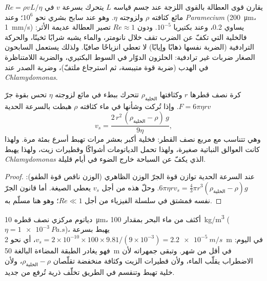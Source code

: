\begin{proposition}\label{prop:b2:unicellular-diversity:reynolds}
\emph{} $Re = \rho v L/\eta$ يقارن قوى العطالة بالقوى
اللزجة عند جسم قياسه $L$ يتحرك بسرعة $v$ في مائع كثافته $\rho$
ولزوجته $\eta$. وهو عند سابح بشري نحو $10^6$؛ وعند
\emph{Paramecium} (\qty{200}{\micro m}، \qty{1}{mm/s}) يساوي 0.2،
وعند بكتيريا $10^{-5}$. ودون $Re \approx 1$ تصير العطالة عديمة
الأثر: فالخلية التي تكفّ عن الضرب تقف خلال نانومتر، والماء يشبه
شرابًا ثخينًا، والحركة الترادفية (الضربة نفسها ذهابًا وإيابًا) لا
تعطي انزياحًا صافيًا. ولذلك يستعمل السابحون الصغار ضربات غير
ترادفية: الحلزون الدوّار في السوط البكتيري، والضربة اللامتناظرة في
الهدب (ضربة قوة متيبسة، ثم استرجاع ملتفّ)، وضربة الصدر عند
\emph{Chlamydomonas}.
\end{proposition}

\begin{theorem}\label{thm:b2:unicellular-diversity:stokes}
كرة نصف قطرها $r$ وكثافتها $\rho_{\text{الخلية}}$ تتحرك ببطء في مائع
لزوجته $\eta$ تحس بقوة جرّ $F = 6\pi\eta r v$. وإذا تُركت وشأنها في
ماء كثافته $\rho$ هبطت بالسرعة الحدية
\[
v_s = \frac{2\,r^2\,(\rho_{\text{الخلية}} - \rho)\,g}{9\eta},
\]
وهي تتناسب مع مربع نصف القطر: فخلية أكبر بعشر مرات تهبط أسرع بمئة
مرة. ولهذا كانت العوالق النباتية صغيرة، ولهذا تحمل الدياتومات
أشواكًا وقطيرات زيت، ولهذا يهبط \emph{Chlamydomonas} الذي يكفّ عن
السباحة خارج الضوء في أيام قليلة.
\end{theorem}
\begin{proof}
عند السرعة الحدية توازن قوة الجرّ الوزن الظاهري (الوزن ناقص قوة
الطفو): $6\pi\eta r v_s = \tfrac{4}{3}\pi r^3
(\rho_{\text{الخلية}} - \rho) g$. وحلّ هذه من أجل $v_s$ يعطي الصيغة.
أما قانون الجرّ نفسه فمشتق في سلسلة الفيزياء من أجل
$Re \ll 1$؛ وهو هنا مسلّم به.
\end{proof}

\begin{example}\label{ex:b2:unicellular-diversity:fall}
دياتوم مركزي نصف قطره \qty{10}{\micro m}، أكثف من ماء البحر بمقدار
\qty{100}{kg/m^3} ($\eta = \qty{1e-3}{Pa.s}$)، يهبط بسرعة
$v_s = 2\times 10^{-10}\times 100\times 9.81/(9\times 10^{-3}) =
\qty{2.2e-5}{m/s}$، أي نحو \qty{2}{m} في اليوم: فهو يغادر الطبقة
المضاءة البالغة \qty{50}{m} في أقل من شهر. وتبقى جمهراته لأن
الاضطراب يقلّب الماء، ولأن قطيرات الزيت وكثافة منخفضة تقلّصان
$\rho_{\text{الخلية}} - \rho$، ولأن خلية تهبط وتنقسم في الطريق تخلّف
ذرية تُرفع من جديد.
\end{example}

